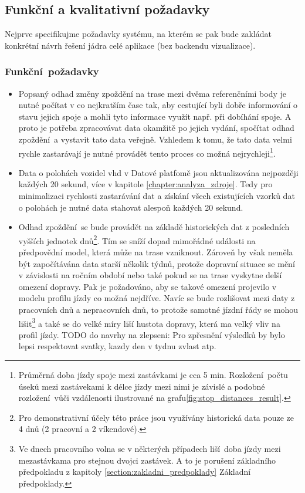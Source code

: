 \subsection{Funkční a kvalitativní požadavky}

Nejprve specifikujme požadavky systému, na kterém se pak bude zakládat
konkrétní návrh řešení jádra celé aplikace (bez backendu vizualizace).

\subsubsection{Funkční požadavky}

\begin{itemize}
	\item
Popsaný odhad změny zpoždění na trase mezi dvěma referenčními body je nutné počítat v co nejkratším čase tak, aby cestující byli dobře informování o stavu jejich spoje a mohli tyto informace využít např. při dobíhání spoje. A proto je potřeba zpracovávat data okamžitě po jejich vydání, spočítat odhad zpoždění a vystavit tato data veřejně. Vzhledem k tomu, že tato data velmi rychle zastarávají je nutné provádět tento proces co možná nejrychleji\footnote{Průměrná doba jízdy spoje mezi zastávkami je cca 5 min. Rozložení počtu úseků mezi zastávekami k délce jízdy mezi nimi je závislé a podobné rozložení vůči vzdálenosti ilustrované na grafu\ref{fig:stop_distances_result}.}.

\item

Data o polohách vozidel \gls{vhd} v Datové platfomě jsou aktualizována nejpozději každých 20 sekund, více v kapitole \ref{chapter:analyza_zdroje}. Tedy pro minimalizaci rychlosti zastarávání dat a získání všech existujících vzorků dat o polohách je nutné data stahovat alespoň každých 20 sekund.

\item

Odhad zpoždění se bude provádět na základě historických dat z posledních vyšších jednotek dnů\footnote{Pro demonstrativní účely této práce jsou využívány historická data pouze ze 4 dnů (2 pracovní a 2 víkendové).}. Tím se sníží dopad mimořádné události na předpovědní model, která může na trase vzniknout. Zároveň by však neměla být započítávána data starší několik týdnů, protože dopravní situace se mění v závislosti na ročním období nebo také pokud se na trase vyskytne delší omezení dopravy. Pak je požadováno, aby se takové omezení projevilo v modelu profilu jízdy co možná nejdříve. Navíc se bude rozlišovat mezi daty z pracovních dnů a nepracovních dnů, to protože samotné jízdní řády se mohou lišit\footnote{Ve dnech pracovního volna se v některých případech liší doba jízdy mezi mezastávkama pro stejnou dvojci zastávek. A to je porušení základního předpokladu z kapitoly \ref{section:zakladni_predpoklady} Základní předpoklady.} a také se do velké míry liší hustota dopravy, která ma velký vliv na profil jízdy. TODO do navrhy na zlepseni: Pro zpřesnění výsledků by bylo lepsi respektovat svatky, kazdy den v tydnu zvlast atp.


\end{itemize}
